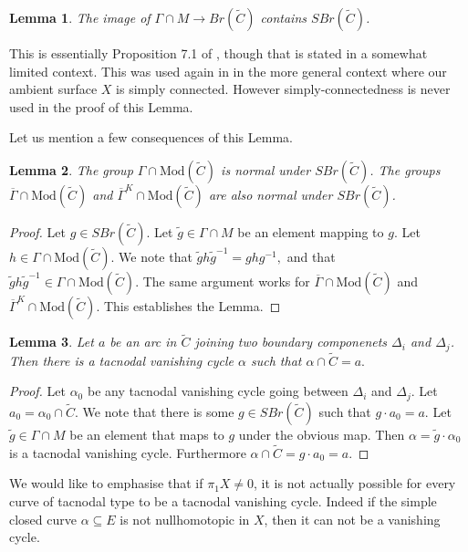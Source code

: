 \documentclass{article}
\newcommand{\Mod}{\textrm{Mod}}
\newtheorem{lemma}{Lemma}[theorem]
\begin{document}
\begin{lemma}\label{imageSBr}
    The image of $\Gamma \cap M \to Br(\tilde C)$ contains $SBr(\tilde C)$.
\end{lemma}

This is essentially Proposition 7.1 of \cite{BSCI}, though that is stated in  a somewhat limited context. This was used again in \cite{BS} in the more general context where our ambient surface $X$ is simply connected. However simply-connectedness is never used in the proof of this Lemma.


Let us mention a few consequences of this Lemma.

\begin{lemma}\label{normal}
    The group $\Gamma \cap \Mod(\tilde C)$ is normal under $SBr(\tilde C)$.
    The groups $\overline{\Gamma} \cap \Mod(\tilde C)$ and $\overline{\Gamma}^K \cap \Mod(\tilde C)$ are also normal under $SBr(\tilde C)$.
\end{lemma}
\begin{proof}
     Let $g \in SBr(\tilde C).$ Let $\tilde g \in \Gamma \cap M$ be an element mapping to $g$. Let $h \in  \Gamma \cap \Mod(\tilde C).$ We note that $\tilde g h \tilde g^{-1} = ghg^{-1},$ and that $\tilde g h \tilde g^{-1} \in \Gamma \cap \Mod(\tilde C).$ The same argument works for $\overline{\Gamma} \cap \Mod(\tilde C)$ and $\overline{\Gamma}^K \cap \Mod(\tilde C).$ This establishes the Lemma. 
\end{proof}
\begin{lemma}
    Let $a$ be an arc in $\tilde C$ joining two boundary componenets $\Delta_i$ and $\Delta_j$. Then there is a tacnodal vanishing cycle $\alpha$ such that $\alpha \cap \tilde C = a.$
\end{lemma}
\begin{proof}
    Let $\alpha_0$ be any tacnodal vanishing cycle going between $\Delta_i$ and $\Delta_j$. Let $a_0 = \alpha_0 \cap \tilde C$. We note that there is some $g \in SBr(\tilde C)$ such that $g \cdot a_0 = a.$ Let $ \tilde g \in \Gamma \cap M$ be an element that maps to $g$ under the obvious map. Then $ \alpha =\tilde g \cdot \alpha_0$ is a tacnodal vanishing cycle. Furthermore $ \alpha \cap \tilde C = g \cdot a_0 =a$.
\end{proof}
We would like to emphasise that if $\pi_1X \neq 0$, it is not actually possible for every curve of tacnodal type to be a tacnodal vanishing cycle. Indeed if  the simple closed curve $\alpha \subseteq E$ is not nullhomotopic in $X$, then it can not be a vanishing cycle. 
\end{document}
